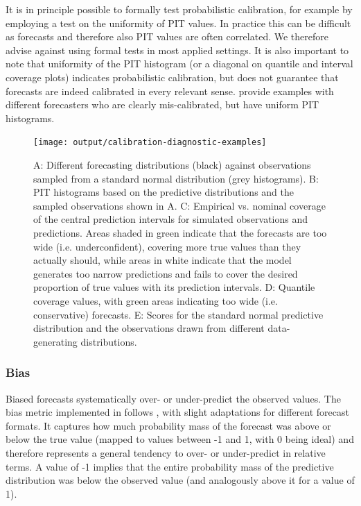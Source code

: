 \documentclass[
]{jss}
\begin{document}
It is in principle possible to formally test probabilistic calibration,
for example by employing a test on the uniformity of PIT values. In
practice this can be difficult as forecasts and therefore also PIT
values are often correlated. We therefore advise against using formal
tests in most applied settings. It is also important to note that
uniformity of the PIT histogram (or a diagonal on quantile and interval
coverage plots) indicates probabilistic calibration, but does not
guarantee that forecasts are indeed calibrated in every relevant sense.
\cite{gneitingProbabilisticForecastsCalibration2007, hamillInterpretationRankHistograms2001a}
provide examples with different forecasters who are clearly
mis-calibrated, but have uniform PIT histograms.

\begin{CodeChunk}
\begin{figure}[!h]

{\centering \texttt{[image: output/calibration-diagnostic-examples]} 

}

\caption[A]{A: Different forecasting distributions (black) against observations sampled from a standard normal distribution (grey histograms). B: PIT histograms based on the predictive distributions and the sampled observations shown in A. C: Empirical vs. nominal coverage of the central prediction intervals for simulated observations and predictions. Areas shaded in green indicate that the forecasts are too wide (i.e. underconfident), covering more true values than they actually should, while areas in white indicate that the model generates too narrow predictions and fails to cover the desired proportion of true values with its prediction intervals. D: Quantile coverage values, with green areas indicating too wide (i.e. conservative) forecasts. E: Scores for the standard normal predictive distribution and the observations drawn from different data-generating distributions.}\label{fig:calibration-plots}
\end{figure}
\end{CodeChunk}

\hypertarget{bias}{%
\subsubsection{Bias}\label{bias}}

Biased forecasts systematically over- or under-predict the observed
values. The bias metric implemented in  follows
\cite{funkAssessingPerformanceRealtime2019}, with slight adaptations for
different forecast formats. It captures how much probability mass of the
forecast was above or below the true value (mapped to values between -1
and 1, with 0 being ideal) and therefore represents a general tendency
to over- or under-predict in relative terms. A value of -1 implies that
the entire probability mass of the predictive distribution was below the
observed value (and analogously above it for a value of 1).
\end{document}
